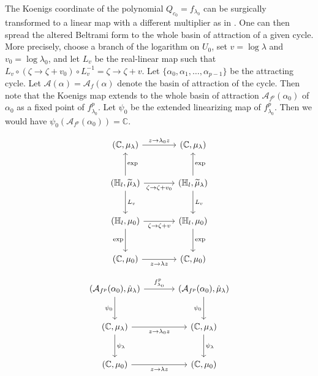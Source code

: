\documentclass[11pt,a4paper]{article}
\begin{document}
    The Koenigs coordinate of the polynomial $Q_{c_0} = f_{\lambda_0}$ can be surgically transformed to a linear map with a different multiplier as in . One can then spread the altered Beltrami form to the whole basin of attraction of a given cycle. More precisely, choose a branch of the logarithm on $U_0$, set $v=\log\lambda$ and $v_0=\log\lambda_0$, and let $L_v$ be the real-linear map such that $L_v\circ (\zeta\rightarrow \zeta+v_0)\circ L_v^{-1}=\zeta\rightarrow\zeta+v$. Let $\{\alpha_0, \alpha_1,\ldots, \alpha_{p-1}\}$ be the attracting cycle. Let $\mathcal{A}(\alpha) = \mathcal{A}_f(\alpha)$ denote the basin of attraction of the cycle. Then note that the Koenigs map extends to the whole basin of attraction $\mathcal{A}_{f^p}(\alpha_0)$ of $\alpha_0$ as a fixed point of $f^p_{\lambda_0}$. Let $\psi_0$ be the extended linearizing map of $f^p_{\lambda_0}$. Then we would have $\psi_0(\mathcal{A}_{f^p}(\alpha_0)) = \mathbb{C}$.

    \[
    \begin{tikzcd}[column sep = large, row sep = large]
        (\mathbb{C}, \mu_{\lambda})
        \arrow[r, "z \rightarrow \lambda_0z"]
        &
        (\mathbb{C}, \mu_{\lambda})
        \\
        (\mathbb{H}_l, \widetilde\mu_{\lambda})
        \arrow[r, "\zeta \rightarrow \zeta+v_0"']
        \arrow[u, "\exp"']
        \arrow[d, "L_v"]
        &
        (\mathbb{H}_l, \widetilde\mu_{\lambda})
        \arrow[u, "\exp"']
        \arrow[d, "L_v"]
        \\
        (\mathbb{H}_l, \mu_0)
        \arrow[r, "\zeta \rightarrow \zeta+v"']
        \arrow[d, "\exp"']
        &
        (\mathbb{H}_l, \mu_0)
        \arrow[d, "\exp"]
        \\
        (\mathbb{C}, \mu_0)
        \arrow[r, "z \rightarrow \lambda z"']
        &
        (\mathbb{C}, \mu_0)
    \end{tikzcd}
    \]

    $$\begin{tikzcd}[column sep = large, row sep = large]
        (\mathcal{A}_{f^p}(\alpha_0), \hat{\mu}_{\lambda})
        \arrow[r, "f^p_{\lambda_0}"]
        \arrow[d, "\psi_0"']
        &
        (\mathcal{A}_{f^p}(\alpha_0), \hat{\mu}_{\lambda})
        \arrow[d, "\psi_0"']
        \\
        (\mathbb{C}, \mu_{\lambda})
        \arrow[r, "z \rightarrow \lambda_0 z"']
        \arrow[d, "\psi_{\lambda}"]
        &
        (\mathbb{C}, \mu_{\lambda})
        \arrow[d, "\psi_{\lambda}"]
        \\
        (\mathbb{C}, \mu_0)
        \arrow[r, "z \rightarrow \lambda z"']
        &
        (\mathbb{C}, \mu_0)
        \end{tikzcd}$$
\end{document}
